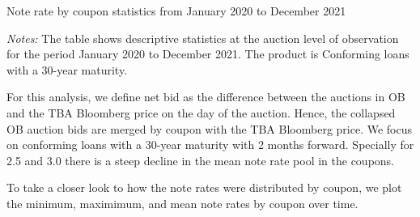 \documentclass[11pt,a4paper]{article}
\begin{document}
\begin{table}[h]
  \centering
  
  \caption{Note rate by coupon statistics from January 2020 to December 2021 }
  \begin{minipage}{\textwidth}
      \footnotesize{\textit{Notes:} The table shows descriptive statistics at the auction level of observation for the period January 2020 to December 2021.
     The product is Conforming loans with a 30-year maturity. } 
      \end{minipage}
\end{table}


For this analysis, we define net bid as the difference between the auctions in OB and the TBA Bloomberg price on the day of the auction. Hence, the collapsed OB auction bids are merged by coupon with the TBA Bloomberg price. We focus on conforming loans with a 30-year maturity with 2 months forward. Specially for 2.5 and 3.0 there is a steep decline in the mean note rate pool in the coupons. 

To take a closer look to how the note rates were distributed by coupon, we plot the minimum, maximimum, and mean note rates by coupon over time. 
\end{document}

